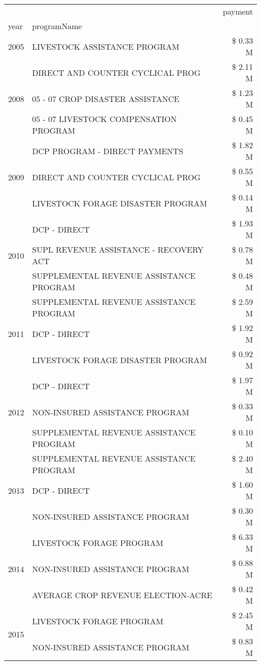 \begin{tabular}{llr}
\toprule
 &  & payment \\
year & programName &  \\
\midrule
2005 & LIVESTOCK ASSISTANCE PROGRAM & \$ 0.33 M \\
\cline{1-3}
\multirow[t]{3}{*}{2008} & DIRECT AND COUNTER CYCLICAL PROG & \$ 2.11 M \\
 & 05 - 07 CROP DISASTER ASSISTANCE & \$ 1.23 M \\
 & 05 - 07 LIVESTOCK COMPENSATION PROGRAM & \$ 0.45 M \\
\cline{1-3}
\multirow[t]{3}{*}{2009} & DCP PROGRAM - DIRECT PAYMENTS & \$ 1.82 M \\
 & DIRECT AND COUNTER CYCLICAL PROG & \$ 0.55 M \\
 & LIVESTOCK FORAGE DISASTER  PROGRAM & \$ 0.14 M \\
\cline{1-3}
\multirow[t]{3}{*}{2010} & DCP - DIRECT & \$ 1.93 M \\
 & SUPL REVENUE ASSISTANCE - RECOVERY ACT & \$ 0.78 M \\
 & SUPPLEMENTAL REVENUE ASSISTANCE PROGRAM & \$ 0.48 M \\
\cline{1-3}
\multirow[t]{3}{*}{2011} & SUPPLEMENTAL REVENUE ASSISTANCE PROGRAM & \$ 2.59 M \\
 & DCP - DIRECT & \$ 1.92 M \\
 & LIVESTOCK FORAGE DISASTER PROGRAM & \$ 0.92 M \\
\cline{1-3}
\multirow[t]{3}{*}{2012} & DCP - DIRECT & \$ 1.97 M \\
 & NON-INSURED ASSISTANCE PROGRAM & \$ 0.33 M \\
 & SUPPLEMENTAL REVENUE ASSISTANCE PROGRAM & \$ 0.10 M \\
\cline{1-3}
\multirow[t]{3}{*}{2013} & SUPPLEMENTAL REVENUE ASSISTANCE PROGRAM & \$ 2.40 M \\
 & DCP - DIRECT & \$ 1.60 M \\
 & NON-INSURED ASSISTANCE PROGRAM & \$ 0.30 M \\
\cline{1-3}
\multirow[t]{3}{*}{2014} & LIVESTOCK FORAGE PROGRAM & \$ 6.33 M \\
 & NON-INSURED ASSISTANCE PROGRAM & \$ 0.88 M \\
 & AVERAGE CROP REVENUE ELECTION-ACRE & \$ 0.42 M \\
\cline{1-3}
\multirow[t]{3}{*}{2015} & LIVESTOCK FORAGE PROGRAM & \$ 2.45 M \\
 & NON-INSURED ASSISTANCE PROGRAM & \$ 0.83 M \\

\end{tabular}
